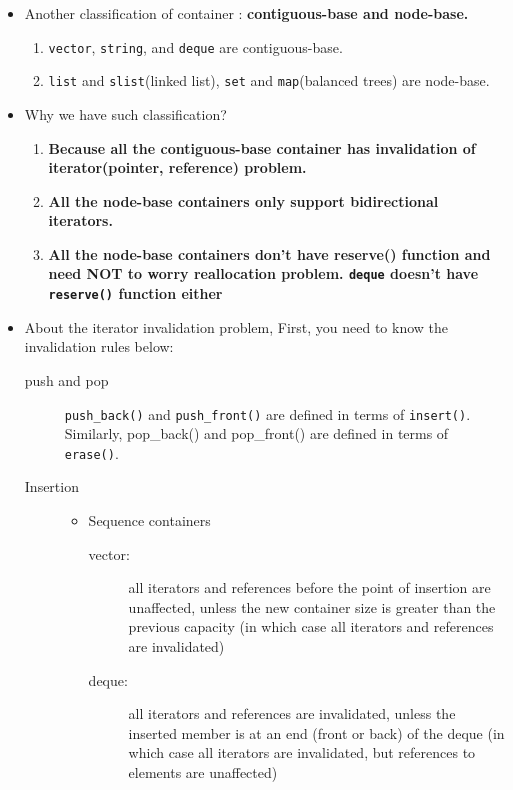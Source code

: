 \documentclass[a4paper,11pt,twoside]{book}
\begin{document}
\begin{itemize}
\item Another classification of container : \textbf{contiguous-base and node-base.}

\begin{enumerate}
\item \texttt{vector}, \texttt{string}, and \texttt{deque} are contiguous-base.
\item \texttt{list} and \texttt{slist}(linked list), \texttt{set} and \texttt{map}(balanced trees) are node-base.
\end{enumerate}

\item Why we have such classification? 
\begin{enumerate}
\item \textbf{Because all the contiguous-base container has invalidation of iterator(pointer, reference) problem. }

\item \textbf{All the node-base containers only support bidirectional iterators. }

\item \textbf{All the node-base containers don't have reserve() function and need NOT to worry reallocation problem. \texttt{deque} doesn't have \texttt{reserve()} function either }
\end{enumerate}

\item About the iterator invalidation problem,  First, you need to know the invalidation rules below: 
\begin{description}
\item[push and pop]
\texttt{push\_back()} and \texttt{push\_front()} are defined in terms of \texttt{insert()}. Similarly, pop\_back() and pop\_front() are defined in terms of \texttt{erase()}.

\item[Insertion]
\begin{itemize}
\item Sequence containers
		\begin{description}
		\item [vector:] all iterators and references before the point of insertion are unaffected, unless the new container size is greater than the previous capacity (in which case all iterators and references are invalidated)
		
		\item [deque:] all iterators and references are invalidated, unless the inserted member is at an end (front or back) of the deque (in which case all iterators are invalidated, but references to elements are unaffected)
		

\end{description}
\end{itemize}
\end{description}
\end{itemize}
\end{document}
